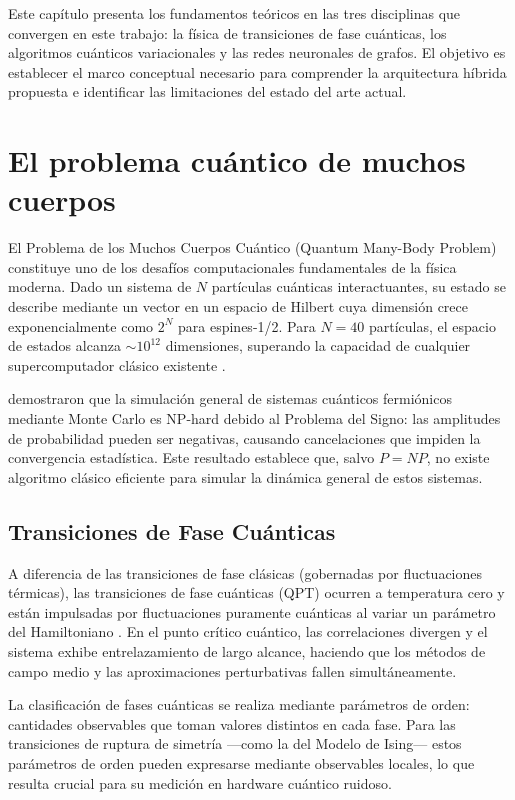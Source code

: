 \documentclass[11pt,a4paper,spanish]{book}
\begin{document}
Este capítulo presenta los fundamentos teóricos en las tres disciplinas que convergen en este trabajo: la física de transiciones de fase cuánticas, los algoritmos cuánticos variacionales y las redes neuronales de grafos. El objetivo es establecer el marco conceptual necesario para comprender la arquitectura híbrida propuesta e identificar las limitaciones del estado del arte actual.

\section{El problema cuántico de muchos cuerpos}

El Problema de los Muchos Cuerpos Cuántico (Quantum Many-Body Problem) constituye uno de los desafíos computacionales fundamentales de la física moderna. Dado un sistema de $N$ partículas cuánticas interactuantes, su estado se describe mediante un vector en un espacio de Hilbert cuya dimensión crece exponencialmente como $2^N$ para espines-1/2. Para $N = 40$ partículas, el espacio de estados alcanza $\sim 10^{12}$ dimensiones, superando la capacidad de cualquier supercomputador clásico existente \citep{feynman1982}.

\citet{troyer2005} demostraron que la simulación general de sistemas cuánticos fermiónicos mediante Monte Carlo es NP-hard debido al Problema del Signo: las amplitudes de probabilidad pueden ser negativas, causando cancelaciones que impiden la convergencia estadística. Este resultado establece que, salvo $P = NP$, no existe algoritmo clásico eficiente para simular la dinámica general de estos sistemas.

\subsection{Transiciones de Fase Cuánticas}

A diferencia de las transiciones de fase clásicas (gobernadas por fluctuaciones térmicas), las transiciones de fase cuánticas (QPT) ocurren a temperatura cero y están impulsadas por fluctuaciones puramente cuánticas al variar un parámetro del Hamiltoniano \citep{dutta2015, sachdev2011}. En el punto crítico cuántico, las correlaciones divergen y el sistema exhibe entrelazamiento de largo alcance, haciendo que los métodos de campo medio y las aproximaciones perturbativas fallen simultáneamente.

La clasificación de fases cuánticas se realiza mediante parámetros de orden: cantidades observables que toman valores distintos en cada fase. Para las transiciones de ruptura de simetría ---como la del Modelo de Ising--- estos parámetros de orden pueden expresarse mediante observables locales, lo que resulta crucial para su medición en hardware cuántico ruidoso.
\end{document}
